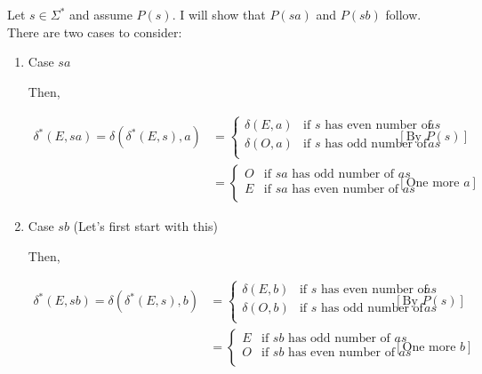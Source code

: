 \documentclass[12pt]{article}
\begin{document}
\begin{enumerate}[1.]
\begin{enumerate}[1.]
        \bigskip

        Let $s \in \Sigma^*$ and assume $P(s)$. I will show that $P(sa)$ and $P(sb)$
        follow. There are two cases to consider:

        \begin{enumerate}[1.]
            \item Case $sa$

            \bigskip

            Then,

            \begin{align}
            \delta^*(E,sa) = \delta(\delta^*(E,s),a) &= \begin{cases}
                \delta(E,a) & \text{if $s$ has even number of $as$}\\
                \delta(O,a) & \text{if $s$ has odd number of $as$}\\
            \end{cases} & [\text{By $P(s)$}]\\
            &= \begin{cases}
                O & \text{if $sa$ has odd number of $as$}\\
                E & \text{if $sa$ has even number of $as$}\\
            \end{cases} & [\text{One more $a$}]
            \end{align}

            \item Case $sb$ (Let's first start with this)

            \begin{mdframed}
            Then,

            \bigskip

            \begin{align}
            \delta^*(E,sb) = \delta(\delta^*(E,s),b) &= \begin{cases}
                \delta(E,b) & \text{if $s$ has even number of $as$}\\
                \delta(O,b) & \text{if $s$ has odd number of $as$}\\
            \end{cases} & [\text{By $P(s)$}]\\
            &= \begin{cases}
                E & \text{if $sb$ has odd number of $as$}\\
                O & \text{if $sb$ has even number of $as$}\\
            \end{cases} & [\text{One more $b$}]
            \end{align}


\end{mdframed}
\end{enumerate}
\end{enumerate}
\end{enumerate}
\end{document}
